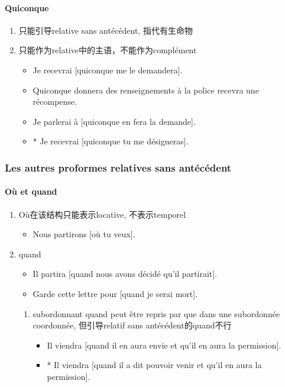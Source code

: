 \documentclass[UTF8]{report}
\begin{document}
\paragraph{Quiconque}
\begin{enumerate}
    \item 只能引导relative sans antécédent, 指代有生命物
    \item 只能作为relative中的主语，不能作为complément
    \begin{itemize}
        \item Je recevrai [quiconque me le demandera].
        \item Quiconque donnera des renseignements à la police recevra une récompense.
        \item Je parlerai à [quiconque en fera la demande].
        \item * Je recevrai [quiconque tu me désigneras].
    \end{itemize}
\end{enumerate}


\subsubsection{Les autres proformes relatives sans antécédent}
\paragraph{Où et quand}
\begin{enumerate}
    \item Où在该结构只能表示locative, 不表示temporel
    \begin{itemize}
        \item Nous partirons [où tu veux].
    \end{itemize}
    \item quand
    \begin{itemize}
        \item Il partira [quand nous avons décidé qu’il partirait].
        \item Garde cette lettre pour [quand je serai mort].
    \end{itemize}
    \begin{enumerate}
        \item subordonnant quand peut être repris par que dans une subordonnée coordonnée, 但引导relatif sans antécédent的quand不行
        \begin{itemize}
            \item Il viendra [quand il en aura envie et qu’il en aura la permission].
            \item * Il viendra [quand il a dit pouvoir venir et qu’il en aura la permission].
        \end{itemize}
    \end{enumerate}
\end{enumerate}
\end{document}
